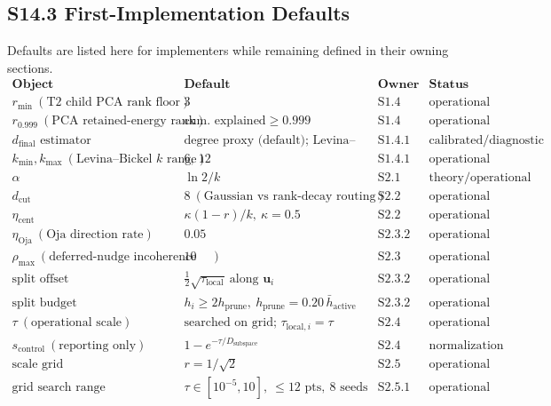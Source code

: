 \documentclass[11pt]{article}
\begin{document}
\subsection*{S14.3 First-Implementation Defaults}
\label{sec:si-defaults}
Defaults are listed here for implementers while remaining defined in their owning sections.
\[
\begin{array}{llll}
\textbf{Object} & \textbf{Default} & \textbf{Owner} & \textbf{Status}\\
\hline
r_{\min}\ (\text{T2 child PCA rank floor}) & 3 & \text{S1.4} & \text{operational}\\
r_{0.999}\ (\text{PCA retained-energy rank}) & \text{cum.\ explained}\ge0.999 & \text{S1.4} & \text{operational}\\
d_{\mathrm{final}}\text{ estimator} & \text{degree proxy (default); Levina--Bickel cross-check} & \text{S1.4.1} & \text{calibrated/diagnostic}\\
k_{\min},k_{\max}\ (\text{Levina--Bickel }k\text{ range}) & 6,\ 12 & \text{S1.4.1} & \text{operational}\\
\alpha & \ln2/k & \text{S2.1} & \text{theory/operational}\\
d_{\mathrm{cut}} & 8\ (\text{Gaussian vs rank-decay routing}) & \text{S2.2} & \text{operational}\\
\eta_{\mathrm{cent}} & \kappa(1-r)/k,\ \kappa=0.5 & \text{S2.2} & \text{operational}\\
\eta_{\mathrm{Oja}}\ (\text{Oja direction rate}) & 0.05 & \text{S2.3.2} & \text{operational}\\
\rho_{\max}\ (\text{deferred-nudge incoherence clamp}) & 10 & \text{S2.3} & \text{operational}\\
\text{split offset} & \tfrac12\sqrt{\tau_{\mathrm{local}}}\ \text{along }\mathbf u_i & \text{S2.3.2} & \text{operational}\\
\text{split budget} & h_i\ge2h_{\mathrm{prune}},\ h_{\mathrm{prune}}=0.20\,\bar h_{\mathrm{active}} & \text{S2.3.2} & \text{operational}\\
\tau\ (\text{operational scale}) & \text{searched on grid; }\tau_{\mathrm{local},i}=\tau & \text{S2.4} & \text{operational}\\
s_{\mathrm{control}}\ (\text{reporting only}) & 1-e^{-\tau/D_{\mathrm{subspace}}} & \text{S2.4} & \text{normalization}\\
\text{scale grid} & r=1/\sqrt2 & \text{S2.5} & \text{operational}\\
\text{grid search range} & \tau\in[10^{-5},10],\ \le12\text{ pts},\ 8\text{ seeds} & \text{S2.5.1} & \text{operational}\\

\end{array}\]
\end{document}
